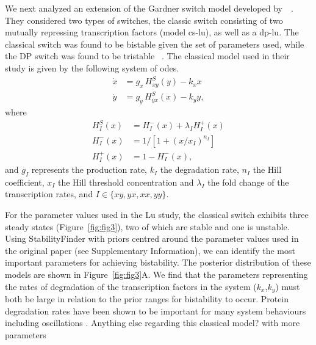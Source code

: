 We next analyzed an extension of the Gardner switch model developed by~\textcite{Lu:2014kc}~\autocite{Lu:2014kc}. They considered two types of switches, the classic switch consisting of two mutually repressing transcription factors (model \acrshort{cs-lu}), as well as a \acrfull{dp-lu}.  The classical switch was found to be bistable given the set of parameters used, while the DP switch was found to be tristable ~\autocite{Lu:2014kc}. The classical model used in their study is given by the following system of \acrshort{ode}s.
\begin{align*}
\dot{x} & = g_{x}\, H^{S}_{xy}(y) -k_{x}x \\
\dot{y} & = g_{y}\,H^{S}_{yx}(x) -k_{y}y,
\end{align*}
where
\begin{align*}
H^{S}_{I}(x) &= H^{-}_{I}(x)+\lambda_{I}H^{+}_{I}(x) \\
H^{-}_{I}(x) &= 1 \big/\left[1+(x/x_{I})^{n_{I}}\right] \\
H^{+}_{I}(x) &= 1-H^{-}_{I}(x),
\end{align*}
and $g_I$ represents the production rate, $k_I$ the degradation rate, $n_I$ the Hill coefficient, $x_I$ the Hill threshold concentration and $\lambda_I$ the fold change of the transcription rates, and $I\in\{xy, yx, xx, yy\}$. 
\par
For the parameter values used in the Lu study, the classical switch exhibits three steady states (Figure~\ref{fig:fig3}), two of which are stable and one is unstable. Using StabilityFinder with priors centred around the parameter values used in the original paper (see Supplementary Information), we can identify the most important parameters for achieving bistability. The posterior distribution of these models are shown in Figure~\ref{fig:fig3}A. We find that the parameters representing the rates of degradation of the transcription factors in the system ($k_x$,$k_y$) must both be large in relation to the prior ranges for bistability to occur. Protein degradation rates have been shown to be important for many system behaviours including oscillations \autocite{XXX}. {\color{red} Anything else regarding this classical model? with more parameters}

